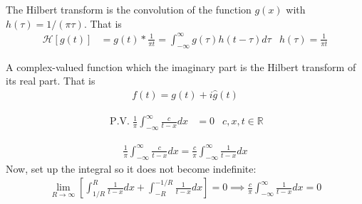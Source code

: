\documentclass[12pt, english]{book}
\makeatletter
\renewenvironment{proof}[1][\proofname]{\par
	\pushQED{\qed}%
	\normalfont \topsep6\p@\@plus6\p@\relax
	\list{}{%
		\settowidth{\leftmargin}{\itshape\proofname:\hskip\labelsep}%
		\setlength{\labelwidth}{0pt}%
		\setlength{\itemindent}{-\leftmargin}%
		}%
	\item[\hskip\labelsep\itshape#1\@addpunct{:}]\ignorespaces
	}{\popQED\endlist\@endpefalse}
\makeatother
\begin{document}
	\begin{observation}
		The Hilbert transform is the convolution of the function \(g(x)\) with \(h(\tau) = 1/(\pi \tau)\). That is 
		\begin{align*}
			\mathcal{H}[g(t)] &= g(t) \ast \frac{1}{\pi t}
				= \int_{-\infty}^{\infty} g(\tau) h(t - \tau) d\tau
				& h(\tau) = \frac{1}{\pi t}
		\end{align*}
	\end{observation}

	\begin{definition}
		\label{Analytic Signal Definition - Complex}
		A complex-valued function which the imaginary part is the Hilbert transform of its real part. That is
		\begin{align*}
			f(t)= g(t) + i\hat{g}(t)
		\end{align*}
	\end{definition}

	\begin{example}
		\label{Hilbert Transform of a Constant Example - Complex}
		\begin{align*}
			\operatorname{P.V.} \frac{1}{\pi} \int_{-\infty}^{\infty} \frac{c}{t-x} dx &= 0
			& c, x, t \in \mathbb{R}
		\end{align*}
		\begin{proof}
		{\color{Grey}
			\begin{align*}
				\frac{1}{\pi} \int_{-\infty}^{\infty} \frac{c}{t-x} dx 
				= \frac{c}{\pi} \int_{-\infty}^{\infty} \frac{1}{t-x} dx
			\end{align*}
			Now, set up the integral so it does not become indefinite: 
			\begin{align*}
				\lim_{R\rightarrow \infty} \left[
				\int_{1/R}^{R} \frac{1}{t-x} dx + \int_{-R}^{-1/R} \frac{1}{t-x} dx
				\right] = 0 
				\implies \frac{c}{\pi} \int_{-\infty}^{\infty} \frac{1}{t-x} dx = 0
			\end{align*}
		}
		\end{proof}
	\end{example}
\end{document}
